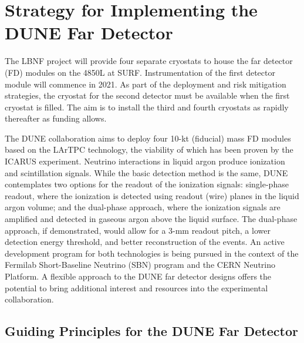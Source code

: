 \section{Strategy for Implementing the DUNE Far Detector}
\label{v1ch3:fd-impl-strategy}

The LBNF project will provide four separate cryostats to house the far detector (FD) modules on the 4850L at SURF.  
Instrumentation of the first detector module
will commence in 2021. %
As part of the deployment and risk mitigation strategies, 
the cryostat for the second detector must be available when the first cryostat 
is filled. The aim is to install the third and fourth cryostats as rapidly thereafter as funding 
allows.

The DUNE collaboration aims to deploy four 10-kt (fiducial) mass FD modules based 
on the %
LArTPC technology, the viability 
of %
which has been proven by the ICARUS experiment. Neutrino 
interactions in liquid argon produce ionization and scintillation signals. While 
the basic detection method is the same, DUNE contemplates two options for the readout 
of the ionization signals: single-phase readout, where the ionization is detected 
using readout (wire) planes in the liquid argon volume; and the dual-phase approach, where 
the ionization signals are amplified and detected in gaseous argon above the liquid 
surface. The dual-phase approach, if demonstrated, would allow for a 3-mm readout 
pitch, a lower detection energy threshold, and better reconstruction of 
the events. 
An active development program for 
both technologies is being pursued in the context of the Fermilab Short-Baseline Neutrino (SBN)
program and 
the CERN Neutrino Platform. 
A flexible 
approach to the DUNE far detector designs offers the potential to bring additional 
interest and resources into the experimental collaboration. 

\subsection{Guiding Principles for the DUNE Far Detector}

